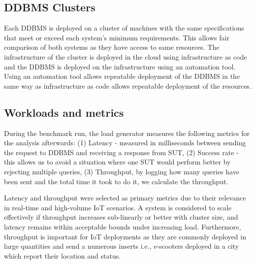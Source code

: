 \subsection{DDBMS Clusters}

Each DDBMS is deployed on a cluster of machines with the same specifications that meet or exceed each system's minimum requirements.
This allows fair comparison of both systems as they have access to same resources.
The infrastructure of the cluster is deployed in the cloud using infrastructure as code and the DDBMS is deployed on the infrastructure using an automation tool.
Using an automation tool allows repeatable deployment of the DDBMS in the same way as infrastructure as code allows repeatable deployment of the resources.

\subsection{Workloads and metrics}
During the benchmark run, the load generator measures the following metrics for the analysis afterwards:
(1) Latency - measured in milliseconds between sending the request to DDBMS and receiving a response from SUT,
(2) Success rate - this allows us to avoid a situation where one SUT would perform better by rejecting multiple queries,
(3) Throughput, by logging how many queries have been sent and the total time it took to do it, we calculate the throughput.

Latency and throughput were selected as primary metrics due to their relevance in real-time and high-volume IoT scenarios.
A system is considered to scale effectively if throughput increases sub-linearly or better with cluster size, and latency remains within acceptable bounds under increasing load.\cite{hossfeldComparingScalabilityCommunication2023}
Furthermore, throughput is important for IoT deployments as they are commonly deployed in large quantities and send a numerous inserts i.e., e-scooters deployed in a city which report their location and status.

